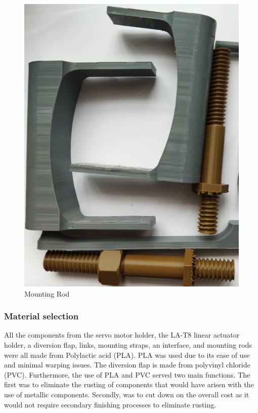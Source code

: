 \begin{itemize}
\begin{figure}[H]
        \includegraphics [height=.6\textheight] {Figures/de.jpg}
        \caption{Mounting Rod}
        \label{fig: 3D printed Mounting Rod}
        \end{figure}

    \end{itemize}
\subsubsection{Material selection}
\par
All the components from the servo motor holder, the LA-T8 linear actuator holder, a diversion flap, links, mounting straps, an interface, and mounting rods were all made from Polylactic acid (PLA). PLA was used due to its ease of use and minimal warping issues. The diversion flap is made from polyvinyl chloride (PVC). Furthermore, the use of PLA and PVC served two main functions. The first was to eliminate the rusting of components that would have arisen with the use of metallic components. Secondly, was to cut down on the overall cost as it would not require secondary finishing processes to eliminate rusting.
